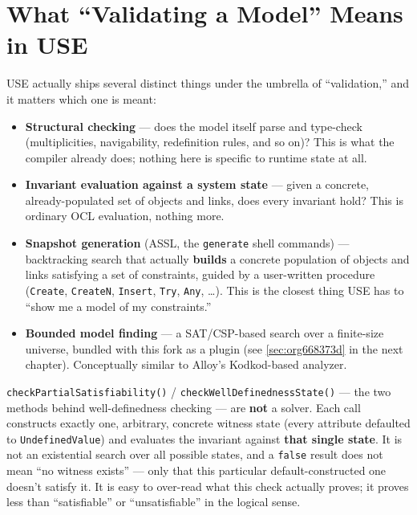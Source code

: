 \documentclass[11pt,twoside,a4paper]{book}
\begin{document}
\section{What ``Validating a Model'' Means in USE}
\label{sec:org0ba3e68}
USE actually ships several distinct things under the umbrella of
``validation,'' and it matters which one is meant:

\begin{itemize}
\item \textbf{Structural checking} --- does the model itself parse and
type-check (multiplicities, navigability, redefinition rules, and so
on)? This is what the compiler already does; nothing here is
specific to runtime state at all.
\item \textbf{Invariant evaluation against a system state} --- given a concrete,
already-populated set of objects and links, does every invariant
hold? This is ordinary OCL evaluation, nothing more.
\item \textbf{Snapshot generation} (ASSL, the \texttt{generate} shell commands) ---
backtracking search that actually \textbf{builds} a concrete population of
objects and links satisfying a set of constraints, guided by a
user-written procedure (\texttt{Create}, \texttt{CreateN}, \texttt{Insert}, \texttt{Try}, \texttt{Any},
\ldots{}). This is the closest thing USE has to ``show me a model of my
constraints.''
\item \textbf{Bounded model finding} --- a SAT/CSP-based search over a
finite-size universe, bundled with this fork as a plugin (see
\ref{sec:org668373d} in the next chapter). Conceptually similar to
Alloy's Kodkod-based analyzer.
\end{itemize}

\begin{manualnote}
\texttt{checkPartialSatisfiability()} / \texttt{checkWellDefinednessState()} --- the
two methods behind well-definedness checking --- are \textbf{not} a solver.
Each call constructs exactly one, arbitrary, concrete witness state
(every attribute defaulted to \texttt{UndefinedValue}) and evaluates the
invariant against \textbf{that single state}. It is not an existential search
over all possible states, and a \texttt{false} result does not mean ``no
witness exists'' --- only that this particular default-constructed one
doesn't satisfy it. It is easy to over-read what this check actually
proves; it proves less than ``satisfiable'' or ``unsatisfiable'' in the
logical sense.
\end{manualnote}
\end{document}
